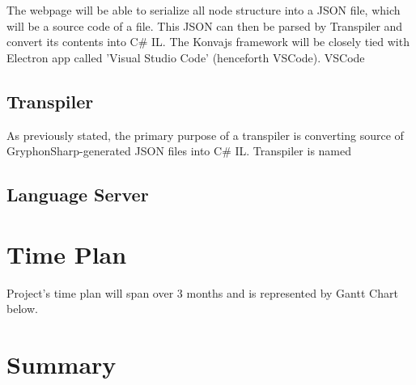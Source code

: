 \documentclass{report}
\begin{document}
The webpage will be able to serialize all node structure into a JSON file, which will be a source code of a file. This JSON can then be parsed by Transpiler and convert its contents into C\# IL.
The Konvajs framework will be closely tied with Electron app called 'Visual Studio Code' (henceforth VSCode). VSCode 
\subsection*{Transpiler}
As previously stated, the primary purpose of a transpiler is converting source of GryphonSharp-generated JSON files into C\# IL. Transpiler is named 
\subsection*{Language Server}


\section{Time Plan}
Project's time plan will span over 3 months and is represented by Gantt Chart below.

\section{Summary}




\end{document}
